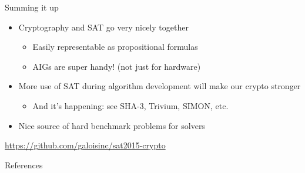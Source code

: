 \documentclass[ignorenonframetext,]{beamer}
\providecommand{\tightlist}{%
  \setlength{\itemsep}{0pt}\setlength{\parskip}{0pt}}
\newcommand{\aurl}[1]{\alert{\url{#1}}}
\begin{document}
\begin{frame}{Summing it up}

\begin{itemize}
\tightlist
\item
  Cryptography and SAT go very nicely together

  \begin{itemize}
  \tightlist
  \item
    Easily representable as propositional formulas
  \item
    AIGs are super handy! (not just for hardware)
  \end{itemize}
\item
  More use of SAT during algorithm development will make our crypto
  stronger

  \begin{itemize}
  \tightlist
  \item
    And it's happening: see SHA-3, Trivium, SIMON, etc.
  \end{itemize}
\item
  Nice source of hard benchmark problems for solvers
\end{itemize}

\begin{center}
\aurl{https://github.com/galoisinc/sat2015-crypto}
\end{center}

\end{frame}

\begin{frame}[allowframebreaks]{References}
  
  
\end{frame}
\end{document}
